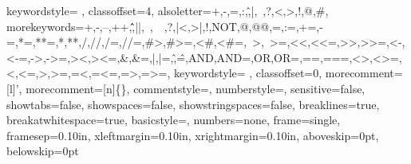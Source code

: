 {  keywordstyle={\color{spin_ctrl} \bf},  
  classoffset=4,
  alsoletter={+,-,=,:,\^,|,~,?,<,>,!,@,\#},
  morekeywords={+,-,--,++,\^\^,||,~,~~,?,|<,>|,!,NOT,@,@@,=,:=,+=,-=,*=,**=,*,**,/,//,/=,//=,\#>,\#>=,<\#,<\#=,~>,~>=,<<,<<=,>>,>>=,<-,<-=,->,->=,><,><=,\&,\&=,|,|=,\^,\^=,AND,AND=,OR,OR=,==,===,<>,<>=,<,<=,>,>=,=<,=<=,=>,=>=},
  keywordstyle={\color{spin_operator} \bf},  
  classoffset=0,
  morecomment=[l]{'},
  morecomment=[n]{\{}{\}},
  commentstyle=\color{spin_comment},
  numberstyle=\color{spin_num},
  sensitive=false,
  showtabs=false,
  showspaces=false,
  showstringspaces=false,
  breaklines=true,
  breakatwhitespace=true,
  basicstyle=\footnotesize\ttfamily,
  numbers=none,
  frame=single,
  framesep=0.10in,
  xleftmargin=0.10in,
  xrightmargin=0.10in,
  aboveskip=0pt,
  belowskip=0pt
}







